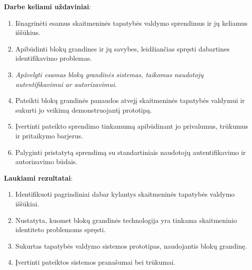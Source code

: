 \textbf{Darbe keliami uždaviniai}:

\begin{enumerate}
    \item Išnagrinėti esamus skaitmeninės tapatybės valdymo sprendimus ir jų keliamus iššūkius.
    \item Apibūdinti blokų grandines ir jų savybes, leidžiančias spręsti dabartines identifikavimo problemas.
    \item \textit{Apžvelgti esamas blokų grandinės sistemas, taikomas naudotojų autentifikavimui ar autorizavimui}.
    \item Pateikti blokų grandinės panaudos atvejį skaitmeninės tapatybės valdymui ir sukurti jo veikimą demonstruojantį prototipą.
    \item Įvertinti pateikto sprendimo tinkamumą apibūdinant jo privalumus, trūkumus ir pritaikymo barjerus.
    \item Palyginti pristatytą sprendimą su standartiniais naudotojų autentifikavimo ir autorizavimo būdais.
\end{enumerate}

\textbf{Laukiami rezultatai}:

\begin{enumerate}
    \item Identifikuoti pagrindiniai dabar kylantys skaitmeninės tapatybės valdymo iššūkiai.
    \item Nustatyta, kuomet blokų grandinės technologija yra tinkama skaitmeninio identiteto problemoms spręsti.
    \item Sukurtas tapatybės valdymo sistemos prototipas, naudojantis blokų grandinę.
    \item Įvertinti pateiktos sistemos pranašumai bei trūkumai.
\end{enumerate}